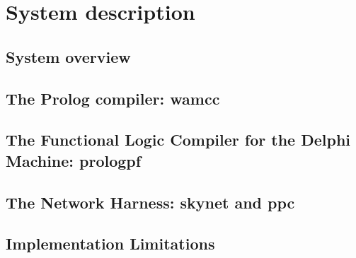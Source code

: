 \chapter{System description}
\label{system}

\section{System overview}

\section{The Prolog compiler: wamcc}

\section{The Functional Logic Compiler for the Delphi Machine: prologpf}

\section{The Network Harness: skynet and ppc}
\label{skynet}

\section{Implementation Limitations}
